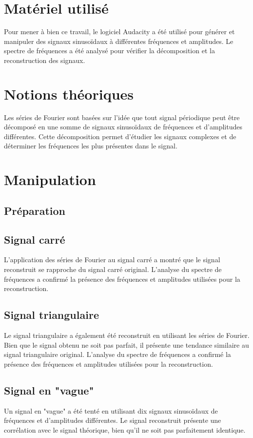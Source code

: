 \documentclass[12pt, letterpaper]{report}
\begin{document}
\chapter{Matériel utilisé}
 Pour mener à bien ce travail, le logiciel Audacity a été utilisé pour générer et manipuler des signaux sinusoïdaux à différentes fréquences et amplitudes. Le spectre de fréquences a été analysé pour vérifier la décomposition et la reconstruction des signaux.

\chapter{Notions théoriques}
Les séries de Fourier sont basées sur l'idée que tout signal périodique peut être décomposé en une somme de signaux sinusoïdaux de fréquences et d'amplitudes différentes. Cette décomposition permet d'étudier les signaux complexes et de déterminer les fréquences les plus présentes dans le signal.


\chapter{Manipulation}
\section{Préparation}
\section{Signal carré}
L'application des séries de Fourier au signal carré a montré que le signal reconstruit se rapproche du signal carré original. L'analyse du spectre de fréquences a confirmé la présence des fréquences et amplitudes utilisées pour la reconstruction.
\section{Signal triangulaire}
Le signal triangulaire a également été reconstruit en utilisant les séries de Fourier. Bien que le signal obtenu ne soit pas parfait, il présente une tendance similaire au signal triangulaire original. L'analyse du spectre de fréquences a confirmé la présence des fréquences et amplitudes utilisées pour la reconstruction.
\section{Signal en "vague"}
Un signal en "vague" a été tenté en utilisant dix signaux sinusoïdaux de fréquences et d'amplitudes différentes. Le signal reconstruit présente une corrélation avec le signal théorique, bien qu'il ne soit pas parfaitement identique.
\end{document}
